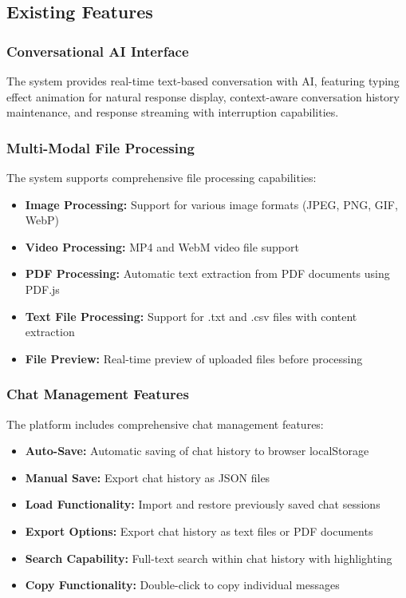 \documentclass[conference]{IEEEtran}
\begin{document}
\subsection{Existing Features}

\subsubsection{Conversational AI Interface}
The system provides real-time text-based conversation with AI, featuring typing effect animation for natural response display, context-aware conversation history maintenance, and response streaming with interruption capabilities.

\subsubsection{Multi-Modal File Processing}
The system supports comprehensive file processing capabilities:
\begin{itemize}[itemsep=0pt, parsep=0pt, leftmargin=*]
    \item \textbf{Image Processing:} Support for various image formats (JPEG, PNG, GIF, WebP)
    \item \textbf{Video Processing:} MP4 and WebM video file support
    \item \textbf{PDF Processing:} Automatic text extraction from PDF documents using PDF.js
    \item \textbf{Text File Processing:} Support for .txt and .csv files with content extraction
    \item \textbf{File Preview:} Real-time preview of uploaded files before processing
\end{itemize}

\subsubsection{Chat Management Features}
The platform includes comprehensive chat management features:
\begin{itemize}[itemsep=0pt, parsep=0pt, leftmargin=*]
    \item \textbf{Auto-Save:} Automatic saving of chat history to browser localStorage
    \item \textbf{Manual Save:} Export chat history as JSON files
    \item \textbf{Load Functionality:} Import and restore previously saved chat sessions
    \item \textbf{Export Options:} Export chat history as text files or PDF documents
    \item \textbf{Search Capability:} Full-text search within chat history with highlighting
    \item \textbf{Copy Functionality:} Double-click to copy individual messages
\end{itemize}
\end{document}
